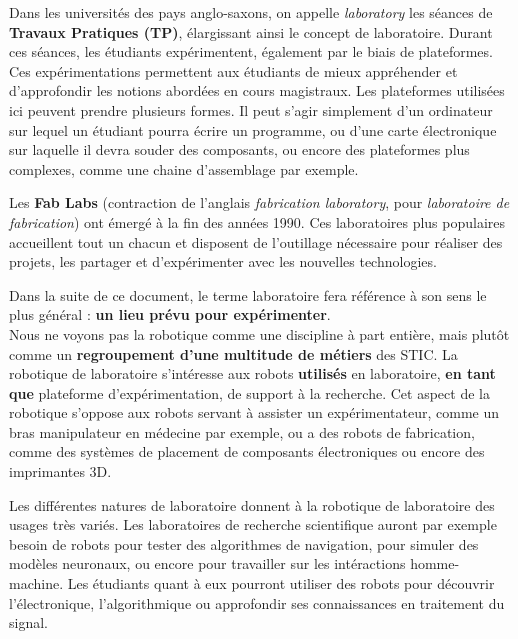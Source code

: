 \documentclass[a4paper,12pt]{report}
\begin{document}
Dans les universités des pays anglo-saxons, on appelle \emph{laboratory} les séances de \textbf{Travaux Pratiques (TP)}, élargissant ainsi le concept de laboratoire.
Durant ces séances, les étudiants expérimentent, également par le biais de plateformes.
Ces expérimentations permettent aux étudiants de mieux appréhender et d'approfondir les notions abordées en cours magistraux.
Les plateformes utilisées ici peuvent prendre plusieurs formes.
Il peut s'agir simplement d'un ordinateur sur lequel un étudiant pourra écrire un programme, 
ou d'une carte électronique sur laquelle il devra souder des composants, ou encore des plateformes plus complexes, comme une chaine d'assemblage par exemple.

Les \textbf{Fab Labs} (contraction de l'anglais \emph{fabrication laboratory}, pour \emph{laboratoire de fabrication}) ont émergé à la fin des années 1990.
Ces laboratoires plus populaires accueillent tout un chacun et disposent de l'outillage nécessaire pour réaliser des projets, les partager et d'expérimenter avec les nouvelles technologies.

Dans la suite de ce document, le terme laboratoire fera référence à son sens le plus général : \textbf{un lieu prévu pour expérimenter}.\\

Nous ne voyons pas la robotique comme une discipline à part entière, mais plutôt comme un \textbf{regroupement d'une multitude de métiers} des STIC.
La robotique de laboratoire s'intéresse aux robots \textbf{utilisés} en laboratoire, \textbf{en tant que} plateforme d'expérimentation, de support à la recherche.
Cet aspect de la robotique s'oppose aux robots servant à assister un expérimentateur, comme un bras manipulateur en médecine par exemple,
ou a des robots de fabrication, comme des systèmes de placement de composants électroniques ou encore des imprimantes 3D.

Les différentes natures de laboratoire donnent à la robotique de laboratoire des usages très variés.
Les laboratoires de recherche scientifique auront par exemple besoin de robots pour tester des algorithmes de navigation,
pour simuler des modèles neuronaux, ou encore pour travailler sur les intéractions homme-machine.
Les étudiants quant à eux pourront utiliser des robots pour découvrir l'électronique, l'algorithmique ou approfondir ses connaissances en traitement du signal.\\
\end{document}
